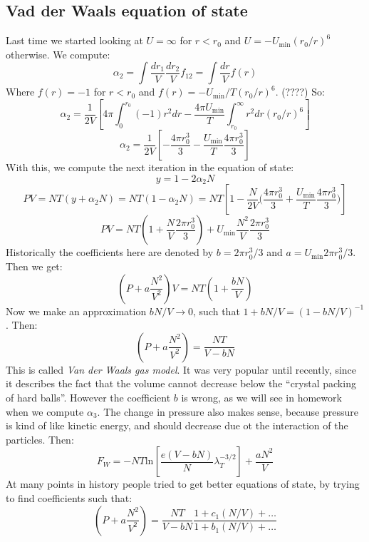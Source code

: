\documentclass[12 pt]{article}
\begin{document}
\subsection*{Vad der Waals equation of state}
Last time we started looking at $U = \infty$ for $r<r_0$ and $U = - U_{\text{min}} (r_0/r)^6$ otherwise. We compute:
\[     \alpha_2 = \int \frac{dr_1}{V} \frac{dr_2}{V} f_{12} = \int \frac{dr}{V} f(r)    \]
Where $f(r) = -1$ for $r<r_0$ and $f(r) = -  U_{\text{min}}/T (r_0/r)^6$. (????) So:
\[      \alpha_2 = \frac{1}{2V} \left[ 4\pi \int_0^{r_0} (-1) r^2 dr  - \frac{4\pi U_{\text{min}}}{T} \int_{r_0}^{\infty} r^2 dr (r_0/r)^6  \right]    \]
\[    \alpha_2 = \frac{1}{2V} \left[  - \frac{4\pi r_0^3}{3} - \frac{U_{\text{min}}}{T} \frac{4\pi r_0^3}{3}  \right]   \]
With this, we compute the next iteration in the equation of state:
\[      y = 1 - 2 \alpha_2 N       \]
\[   PV = NT( y  + \alpha_2 N) = NT(1 - \alpha_2 N) = NT \left[ 1 - \frac{N}{2V}  \big( \frac{4\pi r_0^3}{3} + \frac{U_{\text{min}}}{T} \frac{4\pi r_0^3}{3}  \big)  \right]   \]
\[     PV = NT \left( 1 + \frac{N}{V} \frac{2\pi r_0^3}{3}  \right)   + U_{\text{min}} \frac{N^2}{V} \frac{2\pi r_0^3}{3}  \]
Historically the coefficients here are denoted by $b= 2\pi r_0^3 /3$ and $a = U_{\text{min}}  2\pi r_0^3 /3$. Then we get:
\[      \left( P + a \frac{N^2}{V^2} \right) V = NT \left( 1 + \frac{bN}{V}   \right)     \]
Now we make an approximation $bN/V \to 0$, such that $ 1 + bN/V = (1 - bN/V)^{-1}$. Then:
\[      \left( P + a \frac{N^2}{V^2} \right) =    \frac{NT}{V - bN}   \]
This is called \emph{Van der Waals gas model}. It was very popular until recently, since it describes the fact that the volume cannot decrease below the ``crystal packing of hard balls''. However the coefficient $b$ is wrong, as we will see in homework when we compute $\alpha_3$. The change in pressure also makes sense, because pressure is kind of like kinetic energy, and should decrease due ot the interaction of the particles. Then:
\[     F_W = - NT \text{ln} \left[ \frac{e (V - bN)}{N} \lambda_T^{-3/2}  \right]  + \frac{aN^2}{V}    \]
At many points in history people tried to get better equations of state, by trying to find coefficients such that:
\[       \left( P + a \frac{N^2}{V^2} \right) =    \frac{NT}{V - bN}  \frac{1 + c_1 (N/V) + \dots}{1 + b_1 (N/V) + \dots}      \]
\end{document}
